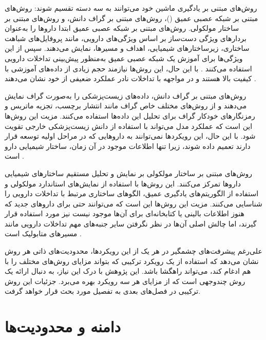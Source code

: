 روش‌های مبتنی بر یادگیری ماشین خود می‌توانند به سه دسته تقسیم شوند: روش‌های مبتنی بر شبکه عصبی عمیق ()، روش‌های مبتنی بر گراف دانش، و روش‌های مبتنی بر ساختار مولکولی. روش‌های مبتنی بر شبکه عصبی عمیق ابتدا داروها را به‌عنوان بردارهای ویژگی دست‌ساز بر اساس ویژگی‌های دارویی، مانند پروفایل‌های شباهت ساختاری، زیرساختارهای شیمیایی، اهداف و مسیرها، نمایش می‌دهند. سپس از این ویژگی‌ها برای آموزش یک شبکه عصبی عمیق به‌منظور پیش‌بینی تداخلات دارویی استفاده می‌کنند \cite{ref_yang2022}. با این حال، این روش‌ها نیازمند حجم زیادی از داده‌های آموزشی با کیفیت بالا هستند و در مواجهه با تداخلات نادر عملکرد ضعیفی از خود نشان می‌دهند \cite{ref_dai2020}.

روش‌های مبتنی بر گراف دانش، داده‌های  زیست‌پزشکی را به‌صورت گراف نمایش می‌دهند و از روش‌های مختلف خاص گراف مانند انتشار برچسب، تجزیه ماتریس و رمزنگارهای خودکار گراف برای تحلیل این داده‌ها استفاده می‌کنند. مزیت این روش‌ها این است که عملکرد مدل می‌تواند با استفاده از دانش  زیست‌پزشکی خارجی تقویت شود. با این حال، این رویکردها نمی‌توانند به داروهایی که در مراحل اولیه توسعه قرار دارند تعمیم داده شوند، زیرا تنها اطلاعات موجود در آن زمان، ساختار شیمیایی دارو است \cite{ref_yang2022}.

روش‌های مبتنی بر ساختار مولکولی بر نمایش و تحلیل مستقیم ساختارهای شیمیایی داروها تمرکز می‌کنند. این روش‌ها با استفاده از نمایش‌های استاندارد مولکولی و استفاده از الگوریتم‌های یادگیری عمیق، الگوهای ساختاری مرتبط با تداخلات دارویی را شناسایی می‌کنند. مزیت این روش‌ها این است که می‌توانند حتی برای داروهای جدید که هنوز اطلاعات بالینی یا کتابخانه‌ای برای آن‌ها موجود نیست نیز مورد استفاده قرار گیرند، اما چالش اصلی آن‌ها در نظر نگرفتن سایر جنبه‌های مهم تداخلات دارویی مانند مسیرهای متابولیک است \cite{ref_kumari2024}.

علی‌رغم پیشرفت‌های چشمگیر در هر یک از این رویکردها، محدودیت‌های ذاتی هر روش نشان می‌دهد که استفاده از یک رویکرد ترکیبی که بتواند مزایای روش‌های مختلف را با هم ادغام کند، می‌تواند راهگشا باشد. این پژوهش با درک این نیاز، به دنبال ارائه یک روش چندوجهی است که از مزایای هر سه رویکرد بهره می‌برد. جزئیات این روش ترکیبی در فصل‌های بعدی به تفصیل مورد بحث قرار خواهد گرفت.

\section{دامنه و محدودیت‌ها}

